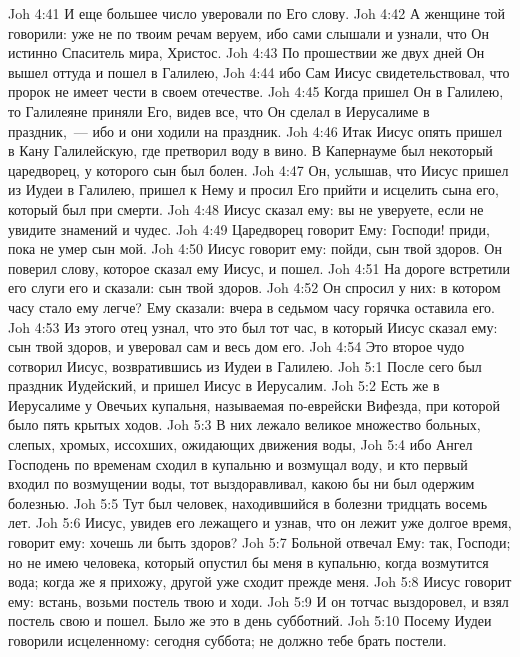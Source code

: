 \vs Joh 4:41 И еще большее число уверовали по Его слову.
\vs Joh 4:42 А женщине той говорили: уже не по твоим речам веруем, ибо сами слышали и узнали, что Он истинно Спаситель мира, Христос.
\rsbpar\vs Joh 4:43 По прошествии же двух дней Он вышел оттуда и пошел в Галилею,
\vs Joh 4:44 ибо Сам Иисус свидетельствовал, что пророк не имеет чести в своем отечестве.
\vs Joh 4:45 Когда пришел Он в Галилею, то Галилеяне приняли Его, видев все, что Он сделал в Иерусалиме в праздник,~--- ибо и они ходили на праздник.
\vs Joh 4:46 Итак Иисус опять пришел в Кану Галилейскую, где претворил воду в вино. В Капернауме был некоторый царедворец, у которого сын был болен.
\vs Joh 4:47 Он, услышав, что Иисус пришел из Иудеи в Галилею, пришел к Нему и просил Его прийти и исцелить сына его, который был при смерти.
\vs Joh 4:48 Иисус сказал ему: вы не уверуете, если не увидите знамений и чудес.
\vs Joh 4:49 Царедворец говорит Ему: Господи! приди, пока не умер сын мой.
\vs Joh 4:50 Иисус говорит ему: пойди, сын твой здоров. Он поверил слову, которое сказал ему Иисус, и пошел.
\vs Joh 4:51 На дороге встретили его слуги его и сказали: сын твой здоров.
\vs Joh 4:52 Он спросил у них: в котором часу стало ему легче? Ему сказали: вчера в седьмом часу горячка оставила его.
\vs Joh 4:53 Из этого отец узнал, что это был тот час, в который Иисус сказал ему: сын твой здоров, и уверовал сам и весь дом его.
\vs Joh 4:54 Это второе чудо сотворил Иисус, возвратившись из Иудеи в Галилею.
\vs Joh 5:1 После сего был праздник Иудейский, и пришел Иисус в Иерусалим.
\vs Joh 5:2 Есть же в Иерусалиме у Овечьих  купальня, называемая по-еврейски Вифезда, при которой было пять крытых ходов.
\vs Joh 5:3 В них лежало великое множество больных, слепых, хромых, иссохших, ожидающих движения воды,
\vs Joh 5:4 ибо Ангел Господень по временам сходил в купальню и возмущал воду, и кто первый входил  по возмущении воды, тот выздоравливал, какою бы ни был одержим болезнью.
\vs Joh 5:5 Тут был человек, находившийся в болезни тридцать восемь лет.
\vs Joh 5:6 Иисус, увидев его лежащего и узнав, что он лежит уже долгое время, говорит ему: хочешь ли быть здоров?
\vs Joh 5:7 Больной отвечал Ему: так, Господи; но не имею человека, который опустил бы меня в купальню, когда возмутится вода; когда же я прихожу, другой уже сходит прежде меня.
\vs Joh 5:8 Иисус говорит ему: встань, возьми постель твою и ходи.
\vs Joh 5:9 И он тотчас выздоровел, и взял постель свою и пошел. Было же это в день субботний.
\vs Joh 5:10 Посему Иудеи говорили исцеленному: сегодня суббота; не должно тебе брать постели.
